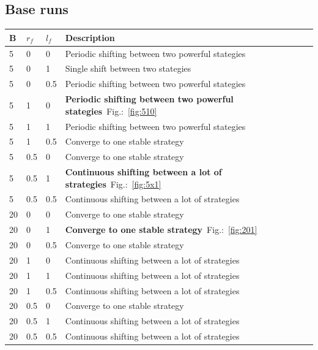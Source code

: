 \subsection{Base runs}
	\begin{tabular}{llll}
		\bf{B} & \bf{$r_f$} & \bf{$l_f$} & \bf{Description}\\
		\hline
		5 & 0 & 0 & Periodic shifting between two powerful stategies\\
		5 & 0 & 1 & Single shift between two stategies\\
		5 & 0 & 0.5 & Periodic shifting between two powerful stategies\\
		5 & 1 & 0 & \textbf{Periodic shifting between two powerful stategies}~Fig.:~\ref{fig:510}\\
		5 & 1 & 1 & Periodic shifting between two powerful stategies\\
		5 & 1 & 0.5 & Converge to one stable strategy\\
		5 & 0.5 & 0 & Converge to one stable strategy\\
		5 & 0.5 & 1 & \textbf{Continuous shifting between a lot of strategies}~Fig.:~\ref{fig:5x1}\\
		5 & 0.5 & 0.5 & Continuous shifting between a lot of strategies\\
		20 & 0 & 0 & Converge to one stable strategy\\
		20 & 0 & 1 & \textbf{Converge to one stable strategy}~Fig.:~\ref{fig:201}\\
		20 & 0 & 0.5 & Converge to one stable strategy\\
		20 & 1 & 0 & Continuous shifting between a lot of strategies\\
		20 & 1 & 1 & Continuous shifting between a lot of strategies\\
		20 & 1 & 0.5 & Continuous shifting between a lot of strategies\\
		20 & 0.5 & 0 & Converge to one stable strategy\\
		20 & 0.5 & 1 & Continuous shifting between a lot of strategies\\
		20 & 0.5 & 0.5 & Continuous shifting between a lot of strategies\\
	\end{tabular}
